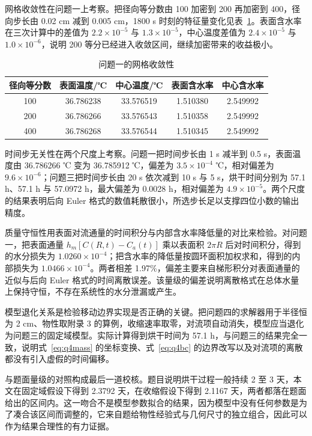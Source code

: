 \documentclass[12pt,a4paper]{article}
\begin{document}
网格收敛性在问题一上考察。把径向等分数由 100 加密到 200 再加密到 400，径向步长由 0.02 cm 减到 0.005 cm，1800 s 时刻的特征量变化见表~\ref{tab:grid}。表面含水率在三次计算中的差值为 $2.2\times10^{-5}$ 与 $1.3\times10^{-5}$，中心温度差值为 $2.4\times10^{-5}$ 与 $1.0\times10^{-6}$，说明 200 等分已经进入收敛区间，继续加密带来的收益极小。

\begin{table}[H]
    \centering
    \caption{问题一的网格收敛性}
    \begin{tabular}{ccccc}
        \toprule
        径向等分数 & 表面温度/℃ & 中心温度/℃ & 表面含水率 & 中心含水率 \\
        \midrule
        100 & 36.786238 & 33.576519 & 1.510380 & 2.549992 \\
        200 & 36.786266 & 33.576543 & 1.510358 & 2.549992 \\
        400 & 36.786268 & 33.576544 & 1.510345 & 2.549992 \\
        \bottomrule
    \end{tabular}
    \label{tab:grid}
\end{table}

时间步无关性在两个尺度上考察。问题一把时间步长由 1 s 减半到 0.5 s，表面温度由 36.786266 ℃ 变为 36.785912 ℃，偏差为 $3.5\times10^{-4}$ ℃，相对偏差为 $9.6\times10^{-6}$；问题三把时间步长由 20 s 依次减到 10 s 与 5 s，烘干时间分别为 57.1 h、57.1 h 与 57.0972 h，最大偏差为 0.0028 h，相对偏差为 $4.9\times10^{-5}$。两个尺度的结果表明后向 Euler 格式的数值耗散很小，所选步长足以支撑四位小数的输出精度。

质量守恒性用表面对流通量的时间积分与内部含水率降低量的对比来检验。对问题一，把表面通量 $h_m[C(R,t)-C_a(t)]$ 乘以表面积 $2\pi R$ 后对时间积分，得到的水分损失为 $1.0260\times10^{-4}$；把含水率的降低量按圆环面积加权求和，得到的内部损失为 $1.0466\times10^{-4}$。两者相差 1.97\%，偏差主要来自梯形积分对表面通量的近似与后向 Euler 格式的时间离散误差。该量级的偏差说明离散格式在总体水量上保持守恒，不存在系统性的水分泄漏或产生。

模型退化关系是检验移动边界实现是否正确的关键。把问题四的求解器用于半径恒为 2 cm、物性取附录 3 的算例，收缩速率取零，对流项自动消失，模型应当退化为问题三的固定域模型。实际计算得到烘干时间为 57.1 h，与问题三的结果完全一致，说明式~\eqref{eq:q4mass} 的坐标变换、式~\eqref{eq:q4bc} 的边界改写以及对流项的离散都没有引入虚假的时间偏移。

与题面量级的对照构成最后一道校核。题目说明烘干过程一般持续 2 至 3 天，本文在固定域假设下得到 2.3792 天，在收缩假设下得到 2.1167 天，两者都落在题面给出的区间内。这一吻合不是模型参数拟合的结果，因为模型中没有任何参数是为了凑合该区间而调整的，它来自题给物性经验式与几何尺寸的独立组合，因此可以作为结果合理性的有力证据。
\end{document}
